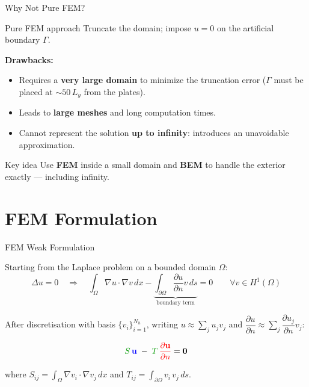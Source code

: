 \documentclass[aspectratio=169]{beamer}
\begin{document}
\begin{frame}{Why Not Pure FEM?}

  \begin{block}{Pure FEM approach}
    Truncate the domain; impose $u=0$ on the artificial boundary $\Gamma$.
  \end{block}

  \medskip
  \textbf{Drawbacks:}
  \begin{itemize}
    \item Requires a \textbf{very large domain} to minimize the truncation error
          ($\Gamma$ must be placed at $\sim 50\,L_y$ from the plates).
    \item Leads to \textbf{large meshes} and long computation times.
    \item Cannot represent the solution \textbf{up to infinity}: introduces an
          unavoidable approximation.
  \end{itemize}

  \medskip
  \begin{alertblock}{Key idea}
    Use \textbf{FEM} inside a small domain and \textbf{BEM} to handle the
    exterior exactly — including infinity.
  \end{alertblock}

\end{frame}

\section{FEM Formulation}

\begin{frame}{FEM Weak Formulation}

  Starting from the Laplace problem on a bounded domain $\Omega$:
  \[
    \Delta u = 0 \quad \Longrightarrow \quad
    \int_\Omega \nabla u \cdot \nabla v\,dx
    - \underbrace{\int_{\partial\Omega} \frac{\partial u}{\partial n} v\,ds}_{\text{boundary term}}
    = 0 \qquad \forall v \in H^1(\Omega)
  \]

  \medskip
  After discretisation with basis $\{v_i\}_{i=1}^{N_h}$, writing
  $u \approx \sum_j u_j v_j$ and
  $\dfrac{\partial u}{\partial n} \approx \sum_j \dfrac{\partial u_j}{\partial n} v_j$:

  \[
    \textcolor{green!60!black}{S}\,\textcolor{blue}{\mathbf{u}}
    \;-\;
    \textcolor{green!60!black}{T}\,\textcolor{red}{\dfrac{\partial\mathbf{u}}{\partial n}}
    = \mathbf{0}
  \]

  where $S_{ij} = \displaystyle\int_\Omega \nabla v_i\cdot\nabla v_j\,dx$
  and $T_{ij} = \displaystyle\int_{\partial\Omega} v_i\,v_j\,ds$.

\end{frame}
\end{document}
